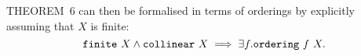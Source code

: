 THEOREM~6 can then be formalised in terms of orderings by explicitly assuming that $X$ is finite:
\begin{equation*}
  \code{finite}\ X \wedge\code{collinear}\ X \implies \exists f. \code{ordering}\ f\ X.
\end{equation*}








